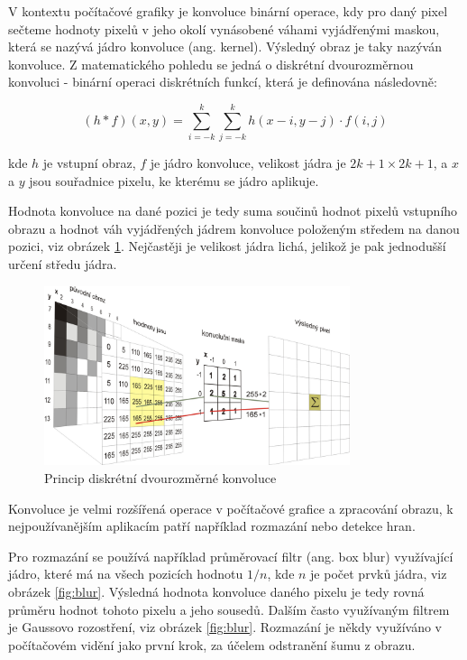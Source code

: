 V kontextu počítačové grafiky je konvoluce binární operace, kdy pro daný pixel
sečteme hodnoty pixelů v jeho okolí vynásobené váhami vyjádřenými maskou, která
se nazývá jádro konvoluce (ang. kernel). Výsledný obraz je taky nazýván
konvoluce. Z matematického pohledu se jedná o diskrétní dvourozměrnou konvoluci
- binární operaci diskrétních funkcí, která je definována následovně:

\begin{equation*}
    (h*f)(x,y)=\sum _{i=-k}^{k}\sum _{j=-k}^{k}h(x-i,y-j)\cdot f(i,j)
\end{equation*}

kde $h$ je vstupní obraz, $f$ je jádro konvoluce, velikost jádra je $2k+1
    \times 2k+1$, a $x$ a $y$ jsou souřadnice pixelu, ke kterému se jádro aplikuje.

Hodnota konvoluce na dané pozici je tedy suma součinů hodnot pixelů vstupního
obrazu a hodnot váh vyjádřených jádrem konvoluce položeným středem na danou
pozici, viz obrázek \ref{fig:convolution}. Nejčastěji je velikost jádra lichá,
jelikož je pak jednodušší určení středu jádra.

\begin{figure}[]
    \centering
    \includegraphics[width=0.8\textwidth]{Figures/convolution.jpg}
    \caption{Princip diskrétní dvourozměrné konvoluce \cite{convolution}}
    \label{fig:convolution}
\end{figure}

Konvoluce je velmi rozšířená operace v počítačové grafice a zpracování obrazu,
k nejpoužívanějším aplikacím patří například rozmazání nebo detekce hran.

Pro rozmazání se používá například průměrovací filtr (ang. box blur)
využívající jádro, které má na všech pozicích hodnotu $1/n$, kde $n$ je počet
prvků jádra, viz obrázek \ref{fig:blur}. Výsledná hodnota konvoluce daného
pixelu je tedy rovná průměru hodnot tohoto pixelu a jeho sousedů. Dalším často
využívaným filtrem je Gaussovo rozostření, viz obrázek \ref{fig:blur}.
Rozmazání je někdy využíváno v počítačovém vidění jako první krok, za účelem
odstranění šumu z obrazu.

